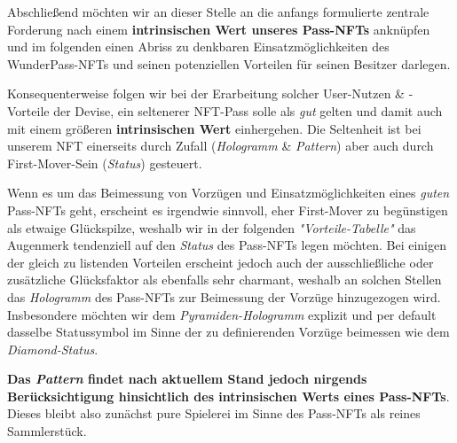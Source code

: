 
Abschließend möchten wir an dieser Stelle an die anfangs formulierte zentrale Forderung nach einem \textbf{intrinsischen Wert unseres Pass-NFTs} anknüpfen und im folgenden einen Abriss zu denkbaren Einsatzmöglichkeiten des WunderPass-NFTs und seinen potenziellen Vorteilen für 
seinen Besitzer darlegen.  

\vspace{0.1cm}

Konsequenterweise folgen wir bei der Erarbeitung solcher User-Nutzen \& -Vorteile der Devise, ein seltenerer NFT-Pass solle als \textit{gut} gelten und damit auch mit einem größeren \textbf{intrinsischen Wert} einhergehen. Die Seltenheit ist bei unserem NFT einerseits durch Zufall (\textit{Hologramm} \& \textit{Pattern}) aber auch durch First-Mover-Sein (\textit{Status}) gesteuert. 

Wenn es um das Beimessung von Vorzügen und Einsatzmöglichkeiten eines \textit{guten} Pass-NFTs geht, erscheint es irgendwie sinnvoll, eher First-Mover zu begünstigen als etwaige Glückspilze, weshalb wir in der folgenden \textit{"Vorteile-Tabelle"} das Augenmerk tendenziell auf den \textit{Status} des Pass-NFTs legen möchten. Bei einigen der gleich \mbox
zu listenden Vorteilen erscheint jedoch auch der ausschließliche oder zusätzliche Glücksfaktor als ebenfalls sehr charmant, weshalb an solchen Stellen das \textit{Hologramm} des Pass-NFTs zur Beimessung der Vorzüge hinzugezogen wird. Insbesondere möchten wir dem \textit{Pyramiden-Hologramm} explizit und per default dasselbe Statussymbol im Sinne der zu definierenden Vorzüge bei\-messen wie dem \textit{Diamond-Status}.

\textbf{Das \textit{Pattern} findet nach aktuellem Stand jedoch nirgends Berücksichtigung hinsichtlich des intrinsischen Werts eines Pass-NFTs}. Dieses bleibt also zunächst pure Spielerei im Sinne des Pass-NFTs als reines Sammlerstück.

\vspace{1.0cm}


